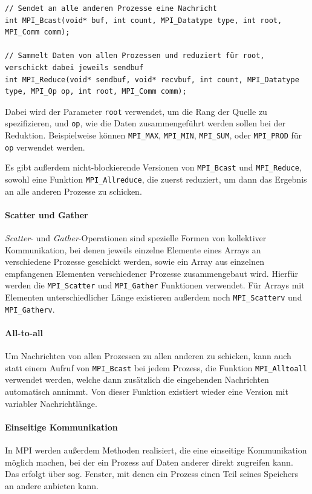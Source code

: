 \begin{lstlisting}[label={lst:9}, caption={Kollektive Kommunikation in MPI.}]
// Sendet an alle anderen Prozesse eine Nachricht
int MPI_Bcast(void* buf, int count, MPI_Datatype type, int root, MPI_Comm comm);

// Sammelt Daten von allen Prozessen und reduziert für root, verschickt dabei jeweils sendbuf
int MPI_Reduce(void* sendbuf, void* recvbuf, int count, MPI_Datatype type, MPI_Op op, int root, MPI_Comm comm);
\end{lstlisting}

Dabei wird der Parameter \lstinline|root| verwendet, um die Rang der Quelle zu spezifizieren, und \lstinline|op|, wie die Daten zusammengeführt werden sollen bei der Reduktion.
Beispielweise können \lstinline|MPI_MAX|, \lstinline|MPI_MIN|, \lstinline|MPI_SUM|, oder \lstinline|MPI_PROD| für \lstinline|op| verwendet werden.

Es gibt außerdem nicht-blockierende Versionen von \lstinline|MPI_Bcast| und \lstinline|MPI_Reduce|, sowohl eine Funktion \lstinline|MPI_Allreduce|, die zuerst reduziert, um dann das Ergebnis an alle anderen Prozesse zu schicken.

\paragraph{Scatter und Gather}
\emph{Scatter}- und \emph{Gather}-Operationen sind spezielle Formen von kollektiver Kommunikation, bei denen jeweils einzelne Elemente eines Arrays an verschiedene Prozesse geschickt werden, sowie ein Array aus einzelnen empfangenen Elementen verschiedener Prozesse zusammengebaut wird.
Hierfür werden die \lstinline|MPI_Scatter| und \lstinline|MPI_Gather| Funktionen verwendet.
Für Arrays mit Elementen unterschiedlicher Länge existieren außerdem noch \lstinline|MPI_Scatterv| und \lstinline|MPI_Gatherv|.

\paragraph{All-to-all}
Um Nachrichten von allen Prozessen zu allen anderen zu schicken, kann auch statt einem Aufruf von \lstinline|MPI_Bcast| bei jedem Prozess, die Funktion \lstinline|MPI_Alltoall| verwendet werden, welche dann zusätzlich die eingehenden Nachrichten automatisch annimmt.
Von dieser Funktion existiert wieder eine Version mit variabler Nachrichtlänge.

\paragraph{Einseitige Kommunikation}
In MPI werden außerdem Methoden realisiert, die eine einseitige Kommunikation möglich machen, bei der ein Prozess auf Daten anderer direkt zugreifen kann.
Das erfolgt über sog. Fenster, mit denen ein Prozess einen Teil seines Speichers an andere anbieten kann.


